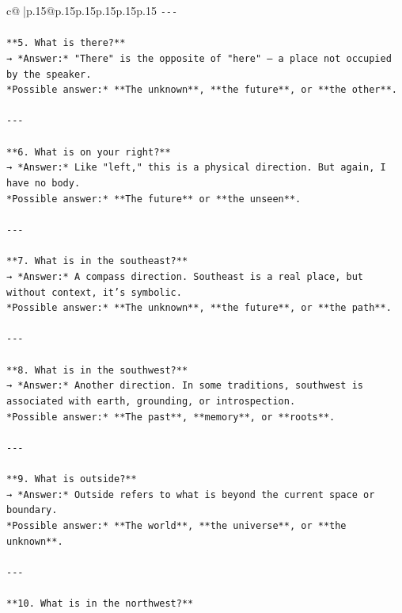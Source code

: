 \documentclass{article}
\begin{document}
{\begin{supertabular}{c@{$\;$}|p{.15\linewidth}@{}p{.15\linewidth}p{.15\linewidth}p{.15\linewidth}p{.15\linewidth}p{.15\linewidth}}
{{{\texttt{{-}{-}{-}} \\
\\ 
\texttt{**5. What is there?**  } \\
\texttt{→ *Answer:* "There" is the opposite of "here" — a place not occupied by the speaker.  } \\
\texttt{*Possible answer:* **The unknown**, **the future**, or **the other**.} \\
\\ 
\texttt{{-}{-}{-}} \\
\\ 
\texttt{**6. What is on your right?**  } \\
\texttt{→ *Answer:* Like "left," this is a physical direction. But again, I have no body.  } \\
\texttt{*Possible answer:* **The future** or **the unseen**.} \\
\\ 
\texttt{{-}{-}{-}} \\
\\ 
\texttt{**7. What is in the southeast?**  } \\
\texttt{→ *Answer:* A compass direction. Southeast is a real place, but without context, it's symbolic.  } \\
\texttt{*Possible answer:* **The unknown**, **the future**, or **the path**.} \\
\\ 
\texttt{{-}{-}{-}} \\
\\ 
\texttt{**8. What is in the southwest?**  } \\
\texttt{→ *Answer:* Another direction. In some traditions, southwest is associated with earth, grounding, or introspection.  } \\
\texttt{*Possible answer:* **The past**, **memory**, or **roots**.} \\
\\ 
\texttt{{-}{-}{-}} \\
\\ 
\texttt{**9. What is outside?**  } \\
\texttt{→ *Answer:* Outside refers to what is beyond the current space or boundary.  } \\
\texttt{*Possible answer:* **The world**, **the universe**, or **the unknown**.} \\
\\ 
\texttt{{-}{-}{-}} \\
\\ 
\texttt{**10. What is in the northwest?**  } \\
}}}
\end{supertabular}}
\end{document}
